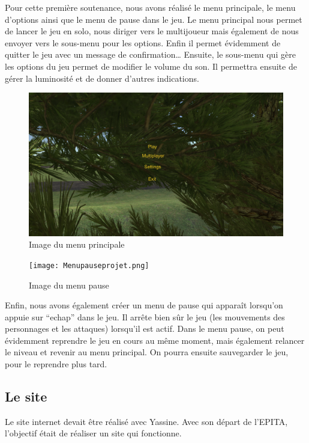 \documentclass[a4paper, 12pt]{article}
\begin{document}
	\par Pour cette première soutenance, nous avons réalisé le menu principale, le menu d’options ainsi que le menu de pause dans le jeu. Le menu principal nous permet de lancer le jeu en solo, nous diriger vers le multijoueur mais également de nous envoyer vers le sous-menu pour les options. Enfin il permet évidemment de quitter le jeu avec un message de confirmation…
Ensuite, le sous-menu qui gère les options du jeu permet de modifier le volume du son. Il permettra ensuite de gérer la luminosité et de donner d’autres indications.
\newpage
	\begin{figure}[!ht]
		\centerline{\includegraphics[scale=0.3]{Menuprojet.png}}
		\caption*{Image du menu principale}		
	\end{figure}
	\begin{figure}[!ht]
		\centerline{\texttt{[image: Menupauseprojet.png]}}
		\caption*{Image du menu pause}
	\end{figure}
	
	\par Enfin, nous avons également créer un menu de pause qui apparaît lorsqu’on appuie sur “echap” dans le jeu. Il arrête bien sûr le jeu (les mouvements des personnages et les attaques) lorsqu’il est actif. Dans le menu pause, on peut évidemment reprendre le jeu en cours au même moment, mais également relancer le niveau et revenir au menu principal. On pourra ensuite sauvegarder le jeu, pour le reprendre plus tard.

	\subsection{Le site}
	 Le site internet devait être réalisé avec Yassine. Avec son départ de l’EPITA, l’objectif était de réaliser un site qui fonctionne. 
	 
\end{document}
